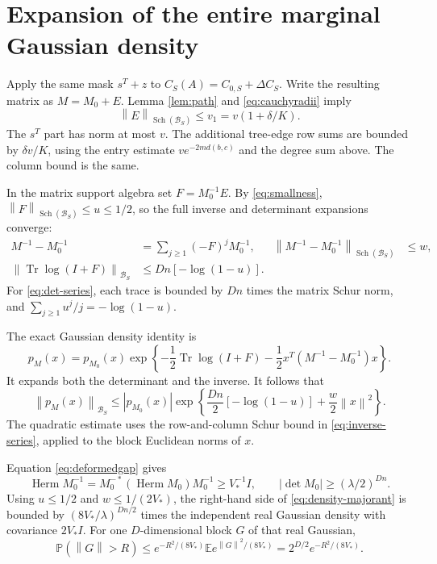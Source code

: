 \documentclass[11pt]{article}
\newcommand{\Herm}{\operatorname{Herm}}
\newcommand{\Tr}{\operatorname{Tr}}
\newcommand{\Sch}{\operatorname{Sch}}
\newcommand{\Bcal}{\mathcal B}
\newcommand{\norm}[1]{\left\|#1\right\|}
\begin{document}
\section{Expansion of the entire marginal Gaussian density}

Apply the same mask $s^T+z$ to $C_S(A)=C_{0,S}+\Delta C_S$.
Write the resulting matrix as $M=M_0+E$. Lemma \ref{lem:path}
and \eqref{eq:cauchyradii} imply
\begin{equation}
 \norm{E}_{\Sch(\Bcal_S)}\le v_1=v(1+\delta/K).
 \label{eq:maskedE}
\end{equation}
The $s^T$ part has norm at most $v$.
The additional tree-edge row sums are bounded by
$\delta v/K$, using the entry estimate
$v e^{-2m d(b,c)}$ and the degree sum above.
The column bound is the same.

In the matrix support algebra set $F=M_0^{-1}E$.
By \eqref{eq:smallness}, $\norm{F}_{\Sch(\Bcal_S)}\le u\le1/2$,
so the full inverse and determinant expansions converge:
\begin{align}
 M^{-1}-M_0^{-1}
    &=\sum_{j\ge1}(-F)^jM_0^{-1},&
 \norm{M^{-1}-M_0^{-1}}_{\Sch(\Bcal_S)}
    &\le w,                                             \label{eq:inverse-series}\\
 \norm{\Tr\log(I+F)}_{\Bcal_S}
    &\le Dn[-\log(1-u)].                                 \label{eq:det-series}
\end{align}
For \eqref{eq:det-series}, each trace is bounded by $Dn$ times
the matrix Schur norm, and $\sum_{j\ge1}u^j/j=-\log(1-u)$.

The exact Gaussian density identity is
\begin{equation}
 p_M(x)=p_{M_0}(x)
 \exp\left\{-\frac12\Tr\log(I+F)
            -\frac12x^T(M^{-1}-M_0^{-1})x\right\}.
 \label{eq:fulldensity}
\end{equation}
It expands both the determinant and the inverse. It follows that
\begin{equation}
 \norm{p_M(x)}_{\Bcal_S}
 \le |p_{M_0}(x)|
       \exp\left\{\frac{Dn}{2}[-\log(1-u)]
                              +\frac w2\norm{x}^2\right\}.
 \label{eq:density-majorant}
\end{equation}
The quadratic estimate uses the row-and-column Schur bound in
\eqref{eq:inverse-series}, applied to the block Euclidean norms of $x$.

Equation \eqref{eq:deformedgap} gives
\[
 \Herm M_0^{-1}
       =M_0^{-*}(\Herm M_0)M_0^{-1}\ge V_*^{-1}I,
 \qquad |\det M_0|\ge(\lambda/2)^{Dn}.
\]
Using $u\le1/2$ and $w\le1/(2V_*)$, the right-hand side of
\eqref{eq:density-majorant} is bounded by
$(8V_*/\lambda)^{Dn/2}$ times the independent real Gaussian density
with covariance $2V_*I$.
For one $D$-dimensional block $G$ of that real Gaussian,
\begin{equation}
 \mathbb P(\norm{G}>R)
 \le e^{-R^2/(8V_*)}
            \mathbb E e^{\norm{G}^2/(8V_*)}
 =2^{D/2}e^{-R^2/(8V_*)}.
 \label{eq:tail}
\end{equation}
\end{document}
